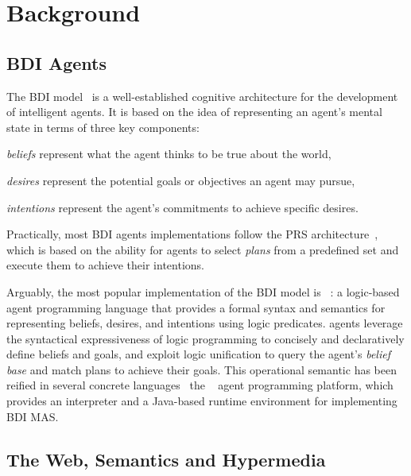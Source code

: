 \documentclass[
]{ceurart}
\begin{document}
\section{Background}
\label{sec:background}

\subsection{BDI Agents}

The \ac{BDI} model~\missingref[bdimodel]{}
is a well-established cognitive architecture for the development of intelligent agents.
%
It is based on the idea of representing an agent's mental state in terms of three key components:
\begin{inlinelist}
  \item \emph{beliefs} represent what the agent thinks to be true about the world,
  \item \emph{desires} represent the potential goals or objectives an agent may pursue,
  \item \emph{intentions} represent the agent's commitments to achieve specific desires.
\end{inlinelist}
%
Practically, most \ac{BDI} agents implementations follow the \ac{PRS} architecture~\missingref[prs]{},
which is based on the ability for agents to select \emph{plans} from a predefined set
and execute them to achieve their intentions.

Arguably, the most popular implementation of the \ac{BDI} model is \agentspeak{}~\missingref[agentspeak]{}:
a logic-based agent programming language that provides a formal syntax and semantics for representing beliefs, desires, and intentions using logic predicates.
\agentspeak{} agents leverage the syntactical expressiveness of logic programming to concisely and declaratively define beliefs and goals, and exploit logic unification to query the agent's \emph{belief base} and match plans to achieve their goals.
This operational semantic has been reified in several concrete languages~\missingref{} the \jason{}~\missingref[jason]{} agent programming platform, which provides an \agentspeak{} interpreter and a Java-based runtime environment for implementing \ac{BDI} \ac{MAS}.

\subsection{The Web, Semantics and Hypermedia}
\end{document}
